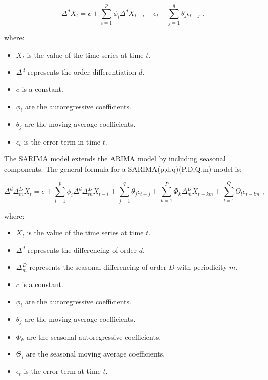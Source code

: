 \begin{equation}
\Delta^d X_t = c + \sum_{i=1}^{p} \phi_i \Delta^d X_{t-i} + \epsilon_t + \sum_{j=1}^{q} \theta_j \epsilon_{t-j} \text{ ,}
\end{equation}

where:
\begin{itemize}
    \item \( X_t \) is the value of the time series at time \( t \).
    \item \( \Delta^d \) represents the order differentiation \( d \).
    \item \( c \) is a constant.
    \item \( \phi_i \) are the autoregressive coefficients.
    \item \( \theta_j \) are the moving average coefficients.
    \item \( \epsilon_t \) is the error term in time \( t \).
\end{itemize}

The SARIMA model extends the ARIMA model by including seasonal components. The general formula for a SARIMA(p,d,q)(P,D,Q,m) model is:

\begin{equation}
\Delta^d \Delta_m^D X_t = c + \sum_{i=1}^{p} \phi_i \Delta^d \Delta_m^D X_{t-i} + \sum_{j=1}^{q} \theta_j \epsilon_{t-j} + \sum_{k=1}^{P} \Phi_k \Delta_m^D X_{t-km} + \sum_{l=1}^{Q} \Theta_l \epsilon_{t-lm} \text{ ,}
\end{equation}

where:
\begin{itemize}
    \item \( X_t \) is the value of the time series at time \( t \).
    \item \( \Delta^d \) represents the differencing of order \( d \).
    \item \( \Delta_m^D \) represents the seasonal differencing of order \( D \) with periodicity \( m \).
    \item \( c \) is a constant.
    \item \( \phi_i \) are the autoregressive coefficients.
    \item \( \theta_j \) are the moving average coefficients.
    \item \( \Phi_k \) are the seasonal autoregressive coefficients.
    \item \( \Theta_l \) are the seasonal moving average coefficients.
    \item \( \epsilon_t \) is the error term at time \( t \).
\end{itemize}
\vspace{10pt}

